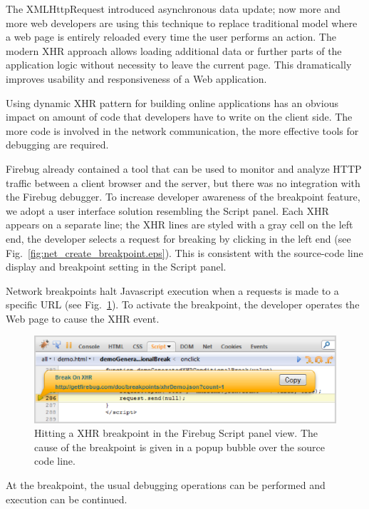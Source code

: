 \documentclass{www2010-accepted}
\begin{document}
The XMLHttpRequest introduced asynchronous data update; now
more and more web developers are using this technique to replace
traditional model where a web page is entirely reloaded every time the
user performs an action. The modern XHR approach allows loading
additional data or further parts of the application logic without
necessity to leave the current page. This dramatically improves
usability and responsiveness of a Web application.

Using dynamic XHR pattern for building online applications has
an obvious impact on amount of code that developers have to write on
the client side. The more code is involved in the network
communication,  the more effective tools for debugging are required.

Firebug already contained a tool that can be used to monitor and
analyze HTTP traffic between a client browser and the server, but
there was no integration with the Firebug debugger.  To increase
developer awareness of the breakpoint feature, we adopt a user interface
solution resembling the Script panel.  Each XHR appears on a separate
line; the XHR lines are styled with a gray cell on the left end, the
developer selects a request for breaking by clicking in the left end
(see Fig.~\ref{fig:net_create_breakpoint.eps}). This is consistent with the
source-code line display and breakpoint setting in the Script panel.

Network breakpoints halt Javascript
execution when a requests is made to a specific URL (see Fig.~\ref{fig:net_hit_XHR_BP.eps}).
To activate the breakpoint, the developer operates the Web page to cause the
XHR event.
\begin{figure}[htp]
\center
\includegraphics[scale=0.7]{net_hit_XHR_BP.eps}
\caption{Hitting a XHR breakpoint in the Firebug Script panel view. The cause of the breakpoint is given in a popup bubble over the source code line.}
\label{fig:net_hit_XHR_BP.eps}
\end{figure}
 At the breakpoint, the usual debugging operations can
be performed and execution can be continued.
\end{document}
